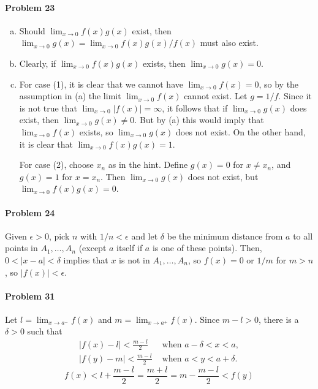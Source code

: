 \documentclass{article}
\begin{document}
\paragraph{Problem 23}
\begin{enumerate}[(a)]
  \item Should $\lim_{x \to 0}f(x)g(x)$ exist, then $\lim_{x \to 0} g(x) =
    \lim_{x \to 0} f(x)g(x)/f(x)$ must also exist.
  \item Clearly, if $\lim_{x \to 0} f(x)g(x)$ exists, then $\lim_{x \to 0} g(x)
    = 0$.
  \item For case (1), it is clear that we cannot have $\lim_{x \to 0} f(x) =
    0$, so by the assumption in (a) the limit $\lim_{x \to 0} f(x)$ cannot
    exist. Let $g = 1/f$. Since it is not true that $\lim_{x \to 0} |f(x)| =
    \infty$, it follows that if $\lim_{x \to 0} g(x)$ does exist, then
    $\lim_{x \to 0} g(x) \neq 0$. But by (a) this would imply that
    $\lim_{x \to 0}f(x)$ exists, so $\lim_{x \to 0} g(x)$ does not exist. On
    the other hand, it is clear that $\lim_{x \to 0} f(x)g(x) = 1$.

    For case (2), choose $x_n$ as in the hint. Define $g(x) = 0$ for $x \neq
    x_n$, and $g(x) = 1$ for $x = x_n$. Then $\lim_{x \to 0} g(x)$ does not
    exist, but $\lim_{x \to 0} f(x)g(x) = 0$.
\end{enumerate}

\paragraph{Problem 24} Given $\epsilon > 0$, pick $n$ with $1/n < \epsilon$ and
let $\delta$ be the minimum distance from $a$ to all points in $A_1, \ldots,
A_n$ (except $a$ itself if $a$ is one of these points). Then, $0 < |x - a| <
\delta$ implies that $x$ is not in $A_1, \ldots, A_n$, so $f(x) = 0$ or $1/m$
for $m > n$, so $|f(x)| < \epsilon$.

\paragraph{Problem 31} Let $l = \lim_{x \to a^-}f(x)$ and $m = \lim_{x \to a^+}
f(x)$. Since $m - l > 0$, there is a $\delta > 0$ such that
\begin{align*}
  |f(x) - l| < \frac{m - l}{2} &\text{ when } a - \delta < x < a, \\
  |f(y) - m| < \frac{m - l}{2} &\text{ when } a < y < a + \delta.
\end{align*}
\[
  f(x) < l + \frac{m - l}{2} = \frac{m + l}{2} = m - \frac{m - l}{2} < f(y)
\]
\end{document}
